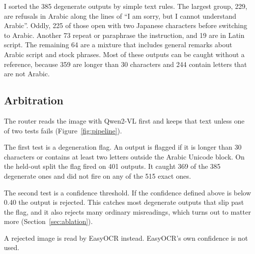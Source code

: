 \documentclass[11pt,a4paper]{article}
\begin{document}
I sorted the 385 degenerate outputs by simple text rules. The largest group,
229, are refusals in Arabic along the lines of ``I am sorry, but I cannot
understand Arabic''. Oddly, 225 of those open with two Japanese characters
before switching to Arabic. Another 73 repeat or paraphrase the instruction,
and 19 are in Latin script. The remaining 64 are a mixture that includes
general remarks about Arabic script and stock phrases. Most of these outputs
can be caught without a reference, because 359 are longer than 30 characters
and 244 contain letters that are not Arabic.

\subsection{Arbitration}
\label{sec:arbitration}

The router reads the image with Qwen2-VL first and keeps that text unless one
of two tests fails (Figure~\ref{fig:pipeline}).

The first test is a degeneration flag. An output is flagged if it is longer
than 30 characters or contains at least two letters outside the Arabic Unicode
block. On the held-out split the flag fired on 401 outputs. It caught 369 of
the 385 degenerate ones and did not fire on any of the 515 exact ones.

The second test is a confidence threshold. If the confidence defined above is
below 0.40 the output is rejected. This catches most degenerate outputs that
slip past the flag, and it also rejects many ordinary misreadings, which
turns out to matter more (Section~\ref{sec:ablation}).

A rejected image is read by EasyOCR instead. EasyOCR's own confidence is not
used.
\end{document}
